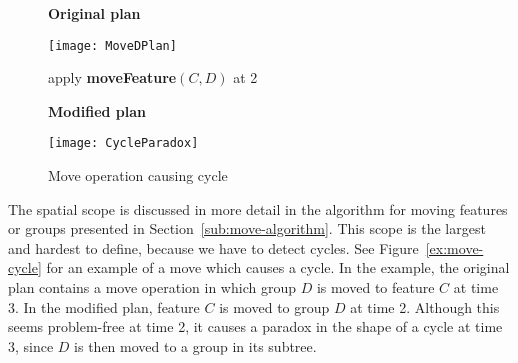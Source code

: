 \begin{itemize}
\begin{figure}[h]
      \textbf{Original plan}

      \texttt{[image: MoveDPlan]}
      \bigskip

      apply \textbf{moveFeature}$(C, D)$ at 2
      \bigskip

      \textbf{Modified plan}

      \texttt{[image: CycleParadox]}
    \caption{Move operation causing cycle}
    \label{ex:move-cycle}
  \end{figure}

  The spatial scope is discussed in more detail in the algorithm for moving features or groups presented in Section~\vref{sub:move-algorithm}. This scope is the largest and hardest to define, because we have to detect cycles. See Figure~\vref{ex:move-cycle} for an example of a move which causes a cycle. In the example, the original plan contains a move operation in which group $D$ is moved to feature $C$ at time 3. In the modified plan, feature $C$ is moved to group $D$ at time 2. Although this seems problem-free at time 2, it causes a paradox in the shape of a cycle at time 3, since $D$ is then moved to a group in its subtree. 


\end{itemize}
